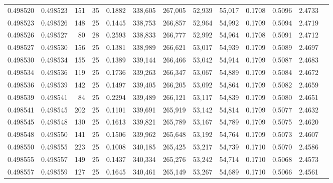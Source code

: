 \begin{tabular}{rrrrrrrrrrrrr}
0.498520 & 0.498523 & 151 &  35 &                                     0.1882 & 338,605 & 267,005 &  52,939 &  55,017 & 0.1708 & 0.5096 & 2.4733 \\
0.498523 & 0.498526 & 148 &  25 &                                     0.1445 & 338,753 & 266,857 &  52,964 &  54,992 & 0.1709 & 0.5094 & 2.4719 \\
0.498526 & 0.498527 &  80 &  28 &                                     0.2593 & 338,833 & 266,777 &  52,992 &  54,964 & 0.1708 & 0.5091 & 2.4712 \\
0.498527 & 0.498530 & 156 &  25 &                                     0.1381 & 338,989 & 266,621 &  53,017 &  54,939 & 0.1709 & 0.5089 & 2.4697 \\
0.498530 & 0.498534 & 155 &  25 &                                     0.1389 & 339,144 & 266,466 &  53,042 &  54,914 & 0.1709 & 0.5087 & 2.4683 \\
0.498534 & 0.498536 & 119 &  25 &                                     0.1736 & 339,263 & 266,347 &  53,067 &  54,889 & 0.1709 & 0.5084 & 2.4672 \\
0.498536 & 0.498539 & 142 &  25 &                                     0.1497 & 339,405 & 266,205 &  53,092 &  54,864 & 0.1709 & 0.5082 & 2.4659 \\
0.498539 & 0.498541 &  84 &  25 &                                     0.2294 & 339,489 & 266,121 &  53,117 &  54,839 & 0.1709 & 0.5080 & 2.4651 \\
0.498541 & 0.498545 & 202 &  25 &                                     0.1101 & 339,691 & 265,919 &  53,142 &  54,814 & 0.1709 & 0.5077 & 2.4632 \\
0.498545 & 0.498548 & 130 &  25 &                                     0.1613 & 339,821 & 265,789 &  53,167 &  54,789 & 0.1709 & 0.5075 & 2.4620 \\
0.498548 & 0.498550 & 141 &  25 &                                     0.1506 & 339,962 & 265,648 &  53,192 &  54,764 & 0.1709 & 0.5073 & 2.4607 \\
0.498550 & 0.498555 & 223 &  25 &                                     0.1008 & 340,185 & 265,425 &  53,217 &  54,739 & 0.1710 & 0.5070 & 2.4586 \\
0.498555 & 0.498557 & 149 &  25 &                                     0.1437 & 340,334 & 265,276 &  53,242 &  54,714 & 0.1710 & 0.5068 & 2.4573 \\
0.498557 & 0.498559 & 127 &  25 &                                     0.1645 & 340,461 & 265,149 &  53,267 &  54,689 & 0.1710 & 0.5066 & 2.4561 \\

\end{tabular}
